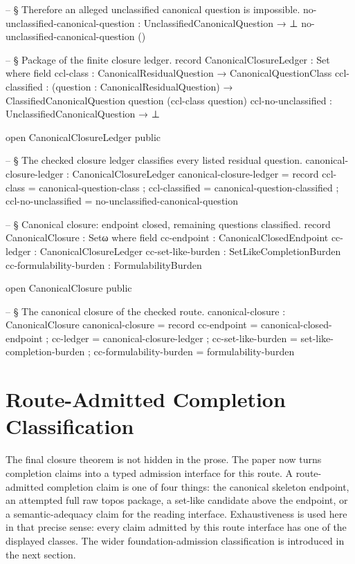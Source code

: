 \documentclass[11pt]{article}
\begin{document}
\begin{code}
-- § Therefore an alleged unclassified canonical question is impossible.
no-unclassified-canonical-question : UnclassifiedCanonicalQuestion → ⊥
no-unclassified-canonical-question ()

-- § Package of the finite closure ledger.
record CanonicalClosureLedger : Set where
  field
    ccl-class             : CanonicalResidualQuestion → CanonicalQuestionClass
    ccl-classified        :
      (question : CanonicalResidualQuestion) →
      ClassifiedCanonicalQuestion question (ccl-class question)
    ccl-no-unclassified   : UnclassifiedCanonicalQuestion → ⊥

open CanonicalClosureLedger public

-- § The checked closure ledger classifies every listed residual question.
canonical-closure-ledger : CanonicalClosureLedger
canonical-closure-ledger = record
  { ccl-class           = canonical-question-class
  ; ccl-classified      = canonical-question-classified
  ; ccl-no-unclassified = no-unclassified-canonical-question
  }

-- § Canonical closure: endpoint closed, remaining questions classified.
record CanonicalClosure : Setω where
  field
    cc-endpoint             : CanonicalClosedEndpoint
    cc-ledger               : CanonicalClosureLedger
    cc-set-like-burden      : SetLikeCompletionBurden
    cc-formulability-burden : FormulabilityBurden

open CanonicalClosure public

-- § The canonical closure of the checked route.
canonical-closure : CanonicalClosure
canonical-closure = record
  { cc-endpoint             = canonical-closed-endpoint
  ; cc-ledger               = canonical-closure-ledger
  ; cc-set-like-burden      = set-like-completion-burden
  ; cc-formulability-burden = formulability-burden
  }
\end{code}

\section{Route-Admitted Completion Classification}

The final closure theorem is not hidden in the prose.  The paper now
turns completion claims into a typed admission interface for this route.
A route-admitted completion claim is one of four things: the canonical
skeleton endpoint, an attempted full raw topos package, a set-like
candidate above the endpoint, or a semantic-adequacy claim for the
reading interface.  Exhaustiveness is used here in that precise sense:
every claim admitted by this route interface has one of the displayed
classes.  The wider foundation-admission classification is introduced in
the next section.
\end{document}
